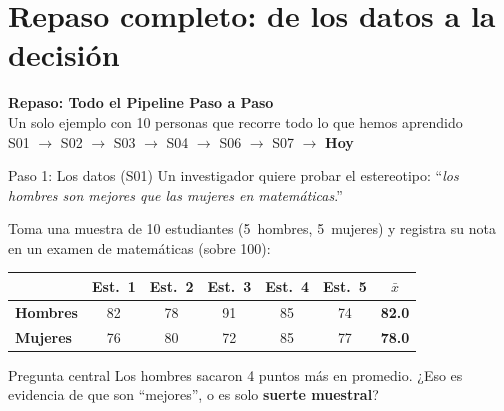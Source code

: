 \documentclass[aspectratio=169, 11pt]{beamer}
\begin{document}
\section{Repaso completo: de los datos a la decisión}

\begin{frame}{}
\vfill
\centering
{\Large\textbf{Repaso: Todo el Pipeline Paso a Paso}}\\[1em]
{\normalsize Un solo ejemplo con 10 personas que recorre \alert{todo} lo que hemos aprendido}\\[0.5em]
{\small S01 $\to$ S02 $\to$ S03 $\to$ S04 $\to$ S06 $\to$ S07 $\to$ \textbf{Hoy}}
\vfill
\end{frame}

\begin{frame}{Paso 1: Los datos (S01)}
\small
Un investigador quiere probar el estereotipo: ``\textit{los hombres son mejores que las mujeres en matemáticas}.''

\vspace{0.2cm}
Toma una muestra de 10 estudiantes (5~hombres, 5~mujeres) y registra su nota en un examen de matemáticas (sobre 100):

\vspace{0.3cm}
\begin{center}
\begin{tabular}{lccccc|c}
\toprule
& Est.\ 1 & Est.\ 2 & Est.\ 3 & Est.\ 4 & Est.\ 5 & $\bar{x}$ \\
\midrule
\textbf{Hombres} & 82 & 78 & 91 & 85 & 74 & \textbf{82.0} \\
\textbf{Mujeres} & 76 & 80 & 72 & 85 & 77 & \textbf{78.0} \\
\bottomrule
\end{tabular}
\end{center}

\vspace{0.3cm}
\begin{alertblock}{Pregunta central}
Los hombres sacaron 4 puntos más en promedio. ¿Eso es evidencia de que son ``mejores'', o es solo \textbf{suerte muestral}?
\end{alertblock}
\end{frame}
\end{document}
